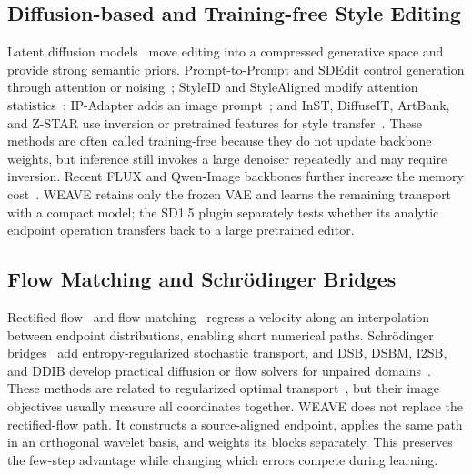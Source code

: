 \documentclass[letterpaper]{article}
\begin{document}
\subsection{Diffusion-based and Training-free Style Editing}
\label{sec:rw-diffusion}
Latent diffusion models~\cite{rombach2022high} move editing into a compressed generative
space and provide strong semantic priors. Prompt-to-Prompt and SDEdit control generation
through attention or noising~\cite{hertz2022prompt,meng2021sdedit}; StyleID and StyleAligned
modify attention statistics~\cite{chung2024style,hertz2024style}; IP-Adapter adds an image
prompt~\cite{ye2023ipadapter}; and InST, DiffuseIT, ArtBank, and Z-STAR use inversion or
pretrained features for style transfer~\cite{zhang2023inst,kim2022diffuseit,zhang2024artbank,lu2024zstar}.
These methods are often called training-free because they do not update backbone weights,
but inference still invokes a large denoiser repeatedly and may require inversion. Recent
FLUX and Qwen-Image backbones further increase the memory cost~\cite{blackforestlabs2024flux,alibaba2024qwen}.
WEAVE retains only the frozen VAE and learns the remaining transport with a compact model;
the SD1.5 plugin separately tests whether its analytic endpoint operation transfers back to
a large pretrained editor.

\subsection{Flow Matching and Schr\"odinger Bridges}
\label{sec:rw-sb}
Rectified flow~\cite{liu2022rectified} and flow matching~\cite{lipman2022flow} regress a
velocity along an interpolation between endpoint distributions, enabling short numerical
paths. Schr\"odinger bridges~\cite{leonard2014survey} add entropy-regularized stochastic
transport, and DSB, DSBM, I2SB, and DDIB develop practical diffusion or flow solvers for
unpaired domains~\cite{debortoli2021dsb,shi2023dsbm,liu2023i2sb,su2023ddib}. These methods
are related to regularized optimal transport~\cite{cuturi2013sinkhorn,peyre2019computational},
but their image objectives usually measure all coordinates together.
WEAVE does not replace the rectified-flow path. It constructs a source-aligned endpoint,
applies the same path in an orthogonal wavelet basis, and weights its blocks separately.
This preserves the few-step advantage while changing which errors compete during learning.
\end{document}
